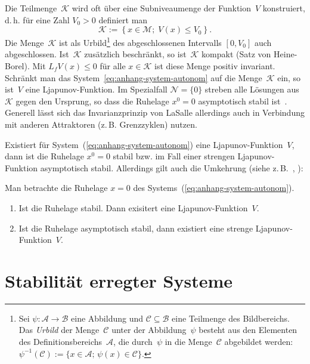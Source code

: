 Die Teilmenge~$\mathcal{K}$ wird oft über eine Subniveaumenge der
Funktion~$V$ konstruiert, d.\,h. für eine Zahl $V_{0}>0$ definiert
man 
\[
\mathcal{K}:=\left\{ x\in\mathcal{M};\;V(x)\leq V_{0}\right\} .
\]
Die Menge~$\mathcal{K}$ ist als Urbild\footnote{Sei $\psi:\mathcal{A}\to\mathcal{B}$ eine Abbildung und $\mathcal{C}\subseteq\mathcal{B}$
eine Teilmenge des Bildbereichs. Das \emph{Urbild} der Menge~$\mathcal{C}$
unter der Abbildung~$\psi$ besteht aus den Elementen des Definitionsbereichs~$\mathcal{A}$,
die durch~$\psi$ in die Menge~$\mathcal{C}$ abgebildet werden:
$\psi^{-1}(\mathcal{C}):=\{x\in\mathcal{A};\,\psi(x)\in\mathcal{C}\}$.} des abgeschlossenen Intervalls $[0,V_{0}]$ auch abgeschlossen. Ist~$\mathcal{K}$
zusätzlich beschränkt, so ist~$\mathcal{K}$ kompakt (Satz von Heine-Borel).
Mit $L_{f}V(x)\leq0$ für alle $x\in\mathcal{K}$ ist diese Menge
positiv invariant. Schränkt man das System~\ref{eq:anhang-system-autonom}
auf die Menge~$\mathcal{K}$ ein, so ist~$V$ eine Ljapunov-Funktion.
Im Spezialfall $\mathcal{N}=\{0\}$ streben alle Lösungen aus~$\mathcal{K}$
gegen den Ursprung, so dass die Ruhelage $x^{0}=0$ asymptotisch stabil
ist~\cite[{Cor.~2.22}]{sepulchre97}. Generell lässt sich das Invarianzprinzip
von LaSalle allerdings auch in Verbindung mit anderen Attraktoren
(z.\,B. Grenz\-zyklen) nutzen.

\medskip{}

Existiert für System~(\ref{eq:anhang-system-autonom}) eine Ljapunov-Funktion~$V$,
dann ist die Ruhe\-lage $x^{0}=0$ stabil bzw. im Fall einer strengen
Ljapunov-Funktion asymptotisch stabil. Allerdings gilt auch die Umkehrung
(siehe z.\,B.~\cite{massera56}, \cite[Abschnitt~{4.4}]{slotine1991}):
\begin{theorem}
\label{thm:Lyapunov-Converse}Man betrachte die Ruhelage $x=0$ des
Systems~(\ref{eq:anhang-system-autonom}).
\begin{enumerate}
\item Ist die Ruhelage stabil. Dann exisitert eine Ljapunov-Funktion~$V$. 
\item Ist die Ruhelage asymptotisch stabil, dann existiert eine strenge
Ljapunov-Funktion~$V$.
\end{enumerate}
\end{theorem}

\section{Stabilität erregter Systeme\label{sec:Stabilitaet-erregter-Systeme}}

